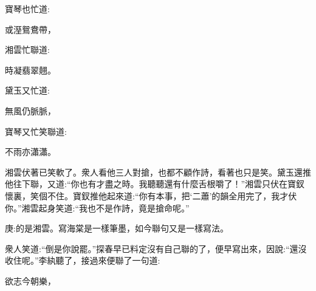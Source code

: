 \begin{parag}
    寶琴也忙道:
\end{parag}


\begin{poem}
    \begin{pl} 或溼鴛鴦帶，\end{pl}
\end{poem}


\begin{parag}
    湘雲忙聯道:
\end{parag}


\begin{poem}
    \begin{pl} 時凝翡翠翹。\end{pl}
\end{poem}


\begin{parag}
    黛玉又忙道:
\end{parag}


\begin{poem}
    \begin{pl} 無風仍脈脈，\end{pl}
\end{poem}


\begin{parag}
    寶琴又忙笑聯道:
\end{parag}


\begin{poem}
    \begin{pl} 不雨亦瀟瀟。\end{pl}
\end{poem}


\begin{parag}
    湘雲伏著已笑軟了。衆人看他三人對搶，也都不顧作詩，看著也只是笑。黛玉還推他往下聯，又道:“你也有才盡之時。我聽聽還有什麼舌根嚼了！”湘雲只伏在寶釵懷裏，笑個不住。寶釵推他起來道:“你有本事，把‘二蕭’的韻全用完了，我才伏你。”湘雲起身笑道:“我也不是作詩，竟是搶命呢。”\begin{note}庚:的是湘雲。寫海棠是一樣筆墨，如今聯句又是一樣寫法。\end{note}衆人笑道:“倒是你說罷。”探春早已料定沒有自己聯的了，便早寫出來，因說:“還沒收住呢。”李紈聽了，接過來便聯了一句道:
\end{parag}


\begin{poem}
    \begin{pl} 欲志今朝樂，\end{pl}
\end{poem}


